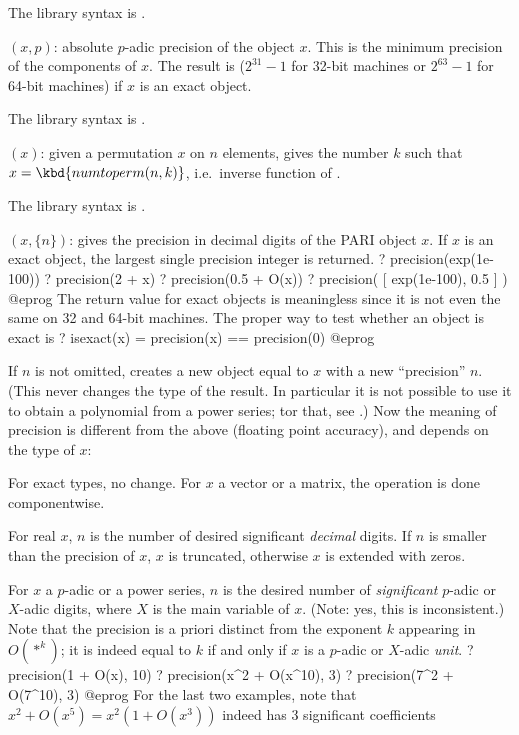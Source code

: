 The library syntax is .

$(x,p)$: \label{se:padicprec}absolute $p$-adic precision of the object $x$. This is the minimum
precision of the components of $x$. The result is 
($2^{31}-1$ for 32-bit machines or $2^{63}-1$ for 64-bit machines) if $x$ is
an exact object.

The library syntax is .

$(x)$: \label{se:permtonum}given a permutation $x$ on $n$ elements, gives the number $k$ such that
$x=\kbd{numtoperm(n,k)}$, i.e.~inverse function of .

The library syntax is .

$(x,\{n\})$: \label{se:precision}gives the precision in decimal digits of the PARI object $x$. If $x$ is
an exact object, the largest single precision integer is returned.
\bprog
? precision(exp(1e-100))
? precision(2 + x)
? precision(0.5 + O(x))
? precision( [ exp(1e-100), 0.5 ] )
@eprog\noindent
The return value for exact objects is meaningless since it is not even the
same on 32 and 64-bit machines. The proper way to test whether an object is
exact is
\bprog
? isexact(x) = precision(x) == precision(0)
@eprog

If $n$ is not omitted, creates a new object equal to $x$ with a new
``precision'' $n$. (This never changes the type of the result. In particular
it is not possible to use it to obtain a polynomial from a power series; tor
that, see .) Now the meaning of precision is different from the
above (floating point accuracy), and depends on the type of $x$:

For exact types, no change. For $x$ a vector or a matrix, the operation is
done componentwise.

For real $x$, $n$ is the number of desired significant \emph{decimal}
digits. If $n$ is smaller than the precision of $x$, $x$ is truncated,
otherwise $x$ is extended with zeros.

For $x$ a $p$-adic or a power series, $n$ is the desired number of
\emph{significant} $p$-adic or $X$-adic digits, where $X$ is the main
variable of $x$. (Note: yes, this is inconsistent.)
Note that the precision is a priori distinct from the exponent $k$ appearing
in $O(*^k)$; it is indeed equal to $k$ if and only if $x$ is a $p$-adic
or $X$-adic \emph{unit}.
\bprog
? precision(1 + O(x), 10)
? precision(x^2 + O(x^10), 3)
? precision(7^2 + O(7^10), 3)
@eprog\noindent
For the last two examples, note that $x^2 + O(x^5) = x^2(1 + O(x^3))$
indeed has 3 significant coefficients

